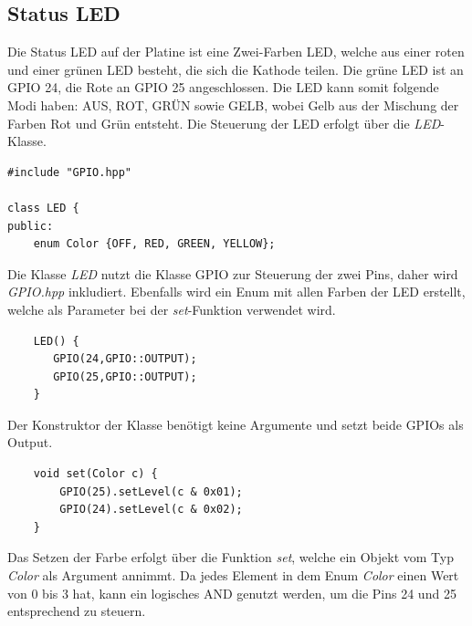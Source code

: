 \documentclass[12pt]{article}
\begin{document}
\subsection{Status LED}
Die Status LED auf der Platine ist eine Zwei-Farben LED, welche aus einer roten und einer grünen LED besteht, die sich die Kathode teilen. Die grüne LED ist an GPIO 24, die Rote an GPIO 25 angeschlossen. Die LED kann somit folgende Modi haben: AUS, ROT, GRÜN sowie GELB, wobei Gelb aus der Mischung der Farben Rot und Grün entsteht. Die Steuerung der LED erfolgt über die \textit{LED}-Klasse.\\
\begin{verbatim}
#include "GPIO.hpp"

class LED {
public:
    enum Color {OFF, RED, GREEN, YELLOW};
\end{verbatim}
\vspace{-2mm}
Die Klasse \textit{LED} nutzt die Klasse GPIO zur Steuerung der zwei Pins, daher wird \textit{GPIO.hpp} inkludiert. Ebenfalls wird ein Enum mit allen Farben der LED erstellt, welche als Parameter bei der \textit{set}-Funktion verwendet wird.\\
\begin{verbatim}
    LED() {
       GPIO(24,GPIO::OUTPUT);
       GPIO(25,GPIO::OUTPUT);
    }
\end{verbatim}
\vspace{-2mm}
Der Konstruktor der Klasse benötigt keine Argumente und setzt beide GPIOs als Output.\\
\begin{verbatim}
    void set(Color c) {
        GPIO(25).setLevel(c & 0x01);
        GPIO(24).setLevel(c & 0x02);
    }
\end{verbatim}
\vspace{-2mm}
Das Setzen der Farbe erfolgt über die Funktion \textit{set}, welche ein Objekt vom Typ \textit{Color} als Argument annimmt. Da jedes Element in dem Enum \textit{Color} einen Wert von 0 bis 3 hat, kann ein logisches AND genutzt werden, um die Pins 24 und 25 entsprechend zu steuern.
\end{document}
